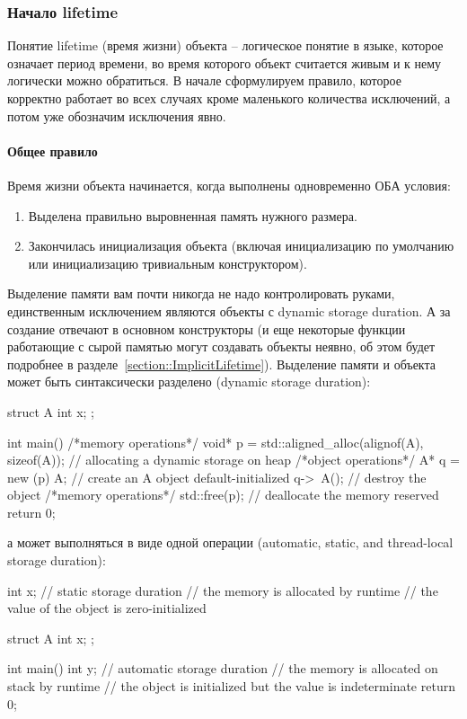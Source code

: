 \documentclass{article}
\begin{document}
\subsubsection{Начало lifetime}

Понятие lifetime (время жизни) объекта -- логическое понятие в языке, которое означает период времени, во время которого объект считается живым и к  нему логически можно обратиться.
В начале сформулируем правило, которое корректно работает во всех случаях кроме маленького количества исключений, а потом уже обозначим исключения явно.

\paragraph{Общее правило}

Время жизни объекта начинается, когда выполнены одновременно ОБА условия:
\begin{enumerate}
\item Выделена правильно выровненная память нужного размера.

\item Закончилась инициализация объекта (включая инициализацию по умолчанию или инициализацию тривиальным конструктором).
\end{enumerate}
Выделение памяти вам почти никогда не надо контролировать руками, единственным исключением являются объекты с dynamic storage duration.
А за создание отвечают в основном конструкторы (и еще некоторые функции работающие с сырой памятью могут создавать объекты неявно, об этом будет подробнее в разделе~\ref{section::ImplicitLifetime}).
Выделение памяти и объекта может быть синтаксически разделено (dynamic storage duration):
\begin{cppcode}[numbers = none]
struct A {
  int x;
};

int main() {
  /*memory operations*/
  void* p = std::aligned_alloc(alignof(A), sizeof(A)); // allocating a dynamic storage on heap
  /*object operations*/
  A* q = new (p) A; // create an A object default-initialized
  q->~A();          // destroy the object
  /*memory operations*/
  std::free(p);     // deallocate the memory reserved
  return 0;
}
\end{cppcode}
а может выполняться в виде одной операции (automatic, static, and thread-local storage duration):
\begin{cppcode}[numbers = none]
int x; // static storage duration
       // the memory is allocated by runtime
       // the value of the object is zero-initialized

struct A {
  int x;
};

int main() {
  int y; // automatic storage duration
         // the memory is allocated on stack by runtime
         // the object is initialized but the value is indeterminate
  return 0;
}
\end{cppcode}
\end{document}

